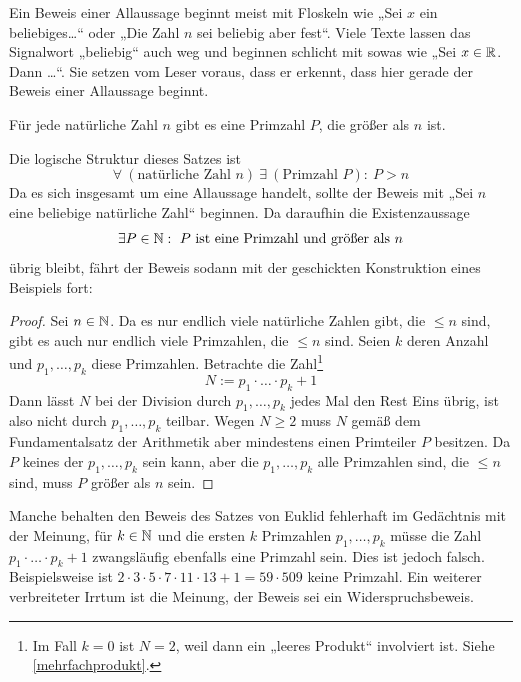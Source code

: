   
\begin{bem}[Signalwörter]
    Ein Beweis einer Allaussage beginnt meist mit Floskeln wie „Sei $x$ ein beliebiges\dots“ oder „Die Zahl $n$ sei beliebig aber fest“. Viele Texte lassen das Signalwort „beliebig“ auch weg und beginnen schlicht mit sowas wie „Sei $x\in \mathbb R$. Dann \dots“. Sie setzen vom Leser voraus, dass er erkennt, dass hier gerade der Beweis einer Allaussage beginnt.
\end{bem}


\begin{bsp} \label{euklid}
    Für jede natürliche Zahl $n$ gibt es eine Primzahl $P$, die größer als $n$ ist.
\end{bsp}
\begin{bem}
    Die logische Struktur dieses Satzes ist
        \[ \forall\ (\text{natürliche Zahl $n$})\ \exists\ (\text{Primzahl $P$}):\ P>n \]
    Da es sich insgesamt um eine Allaussage handelt, sollte der Beweis mit „Sei $n$ eine beliebige natürliche Zahl“ beginnen. Da daraufhin die Existenzaussage
        \[ \exists P\in \mathbb N:\ \text{$P$ ist eine Primzahl und größer als $n$} \]
    übrig bleibt, fährt der Beweis sodann mit der geschickten Konstruktion eines Beispiels fort:
\end{bem}
\begin{proof}
    Sei $n\in \mathbb N$. Da es nur endlich viele natürliche Zahlen gibt, die $\le n$ sind, gibt es auch nur endlich viele Primzahlen, die $\le n$ sind. Seien $k$ deren Anzahl und $p_1,\dots , p_k$ diese Primzahlen. Betrachte die Zahl\footnote{Im Fall $k=0$ ist $N=2$, weil dann ein „leeres Produkt“ involviert ist. Siehe \cref{mehrfachprodukt}.}
        \[ N := p_1\cdot\ldots\cdot p_k + 1 \]
    Dann lässt $N$ bei der Division durch $p_1,\dots , p_k$ jedes Mal den Rest Eins übrig, ist also nicht durch $p_1,\dots , p_k$ teilbar. Wegen $N\ge 2$ muss $N$ gemäß dem Fundamentalsatz der Arithmetik aber mindestens einen Primteiler $P$ besitzen. Da $P$ keines der $p_1,\dots ,p_k$ sein kann, aber die $p_1,\dots , p_k$ alle Primzahlen sind, die $\le n$ sind, muss $P$ größer als $n$ sein.
\end{proof}


\begin{bem}
    Manche behalten den Beweis des Satzes von Euklid fehlerhaft im Gedächtnis mit der Meinung, für $k\in \mathbb N$ und die ersten $k$ Primzahlen $p_1,\dots , p_k$ müsse die Zahl $p_1\cdot\ldots\cdot p_k + 1$ zwangsläufig ebenfalls eine Primzahl sein. Dies ist jedoch falsch. Beispielsweise ist $2\cdot 3\cdot 5\cdot 7\cdot 11\cdot 13+1=59\cdot 509$ keine Primzahl. Ein weiterer verbreiteter Irrtum ist die Meinung, der Beweis sei ein Widerspruchsbeweis.
\end{bem}


